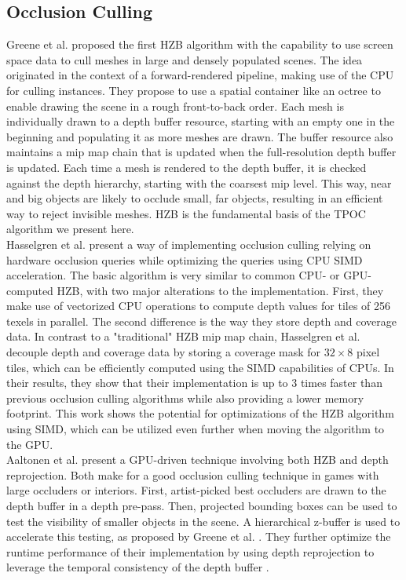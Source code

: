 \documentclass[conference]{IEEEtran}
\begin{document}
\subsection{Occlusion Culling} \label{subsec-occlusion-culling}

\noindent
Greene et al. \cite{b1} proposed the first \ac{HZB} algorithm with the capability to use 
screen space data to cull meshes in large and densely populated scenes. The idea originated 
in the context of a forward-rendered pipeline, making use of the \ac{CPU} for culling instances. 
They propose to use a spatial container like an octree to enable drawing the scene in a rough 
front-to-back order. Each mesh is individually drawn to a depth buffer resource, starting with 
an empty one in the beginning and populating it as more meshes are drawn. The buffer resource 
also maintains a mip map chain that is updated when the full-resolution depth buffer is updated. 
Each time a mesh is rendered to the depth buffer, it is checked against the depth hierarchy, 
starting with the coarsest mip level. This way, near and big objects are likely to occlude small, 
far objects, resulting in an efficient way to reject invisible meshes. \ac{HZB} is the 
fundamental basis of the \ac{TPOC} algorithm we present here.\\

\noindent
Hasselgren et al. \cite{b3} present a way of implementing occlusion culling relying on hardware 
occlusion queries while optimizing the queries using \ac{CPU} \ac{SIMD} acceleration. The basic 
algorithm is very similar to common \ac{CPU}- or \ac{GPU}-computed \ac{HZB}, with two major 
alterations to the implementation. 
First, they make use of vectorized \ac{CPU} operations to compute depth values for tiles of 256 
texels in parallel. The second difference is the way they store depth and coverage data. In contrast 
to a "traditional" \ac{HZB} mip map chain, Hasselgren et al. decouple depth and coverage data by 
storing a coverage mask for $32 \times 8$ pixel tiles, which can be efficiently computed using 
the \ac{SIMD} capabilities of \ac{CPU}s. In their results, they show that their implementation is 
up to 3 times faster than previous occlusion culling algorithms while also providing a lower memory 
footprint. This work shows the potential for optimizations of the \ac{HZB} algorithm using \ac{SIMD}, 
which can be utilized even further when moving the algorithm to the \ac{GPU}. \\

\noindent
Aaltonen et al. \cite{b4} present a \ac{GPU}-driven technique involving both \ac{HZB} and depth 
reprojection. Both make for a good occlusion culling technique in games with large occluders or 
interiors. First, artist-picked best occluders are drawn to the depth buffer in a depth pre-pass. 
Then, projected bounding boxes can be used to test the visibility of smaller objects in the scene. 
A hierarchical z-buffer is used to accelerate this testing, as proposed by Greene et al. \cite{b1}. 
They further optimize the runtime performance of their implementation by using depth reprojection 
to leverage the temporal consistency of the depth buffer \cite{b14}. \\
\end{document}
